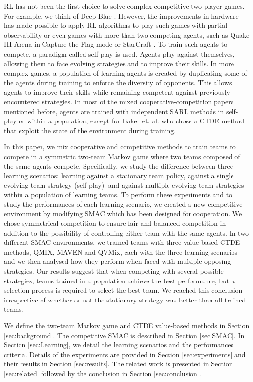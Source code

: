 RL has not been the first choice to solve complex competitive two-player games.
For example, we think of Deep Blue \citep{campbell2002deep}.
However, the improvements in hardware has made possible to apply RL algorithms to play such games with partial observability \citep{silver2018general} or even games with more than two competing agents, such as Quake III Arena in Capture the Flag mode \citep{jaderberg2019human} or StarCraft \citep{vinyals2019grandmaster}.
To train such agents to compete, a paradigm called self-play is used.
Agents play against themselves, allowing them to face evolving strategies and to improve their skills.
In more complex games, a population of learning agents is created by duplicating some of the agents during training to enforce the diversity of opponents.
This allows agents to improve their skills while remaining competent against previously encountered strategies.
In most of the mixed cooperative-competition papers mentioned before, agents are trained with independent SARL methods in self-play or within a population, except for Baker et. al. \cite{baker2019emergent} who chose a CTDE method that exploit the state of the environment during training.

In this paper, we mix cooperative and competitive methods to train teams to compete in a symmetric two-team Markov game where two teams composed of the same agents compete.
Specifically, we study the difference between three learning scenarios: learning against a stationary team policy, against a single evolving team strategy (self-play), and against multiple evolving team strategies within a population of learning teams.
To perform these experiments and to study the performances of each learning scenario, we created a new competitive environment by modifying SMAC which has been designed for cooperation.
We chose symmetrical competition to ensure fair and balanced competition in addition to the possibility of controlling either team with the same agents. 
In two different SMAC environments, we trained teams with three value-based CTDE methods, QMIX, MAVEN and QVMix, each with the three learning scenarios and we then analysed how they perform when faced with multiple opposing strategies.
Our results suggest that when competing with several possible strategies, teams trained in a population achieve the best performance, but a selection process is required to select the best team.
We reached this conclusion irrespective of whether or not the stationary strategy was better than all trained teams.

We define the two-team Markov game and CTDE value-based methods in Section \ref{sec:background}.
The competitive SMAC is described in Section \ref{sec:SMAC}.
In Section \ref{sec:Learning}, we detail the learning scenarios and the performances criteria.
Details of the experiments are provided in Section \ref{sec:experiments} and their results in Section \ref{sec:results}.
The related work is presented in Section \ref{sec:related} followed by the conclusion in Section \ref{sec:conclusion}.

